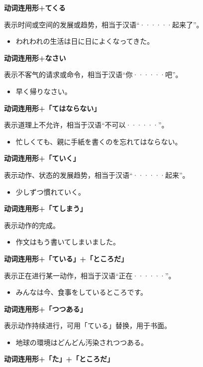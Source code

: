 {\bf
\noindent 动词连用形+てくる
}

表示时间或空间的发展或趋势，相当于汉语``······起来了''。
\begin{itemize}
  \item われわれの生活は日に日によくなってきた。
\end{itemize}

{\bf
\noindent 动词连用形+なさい
}

表示不客气的请求或命令，相当于汉语``你······吧''。
\begin{itemize}
  \item 早く帰りなさい。
\end{itemize}

{\bf
\noindent 动词连用形+「てはならない」
}

表示道理上不允许，相当于汉语``不可以······''。
\begin{itemize}
  \item 忙しくても、親に手紙を書くのを忘れてはならない。
\end{itemize}

{\bf
\noindent 动词连用形+「ていく」
}

表示动作、状态的发展趋势，相当于汉语``······起来''。
\begin{itemize}
  \item 少しずつ慣れていく。
\end{itemize}

{\bf
\noindent 动词连用形+「てしまう」
}

表示动作的完成。
\begin{itemize}
  \item 作文はもう書いてしまいました。
\end{itemize}

{\bf
\noindent 动词连用形+「ている」+「ところだ」
}

表示正在进行某一动作，相当于汉语``正在······''。
\begin{itemize}
  \item みんなは今、食事をしているところです。
\end{itemize}

{\bf
\noindent 动词连用形+「つつある」
}

表示动作持续进行，可用「ている」替换，用于书面。
\begin{itemize}
  \item 地球の環境はどんどん汚染されつつある。
\end{itemize}

{\bf
\noindent 动词连用形+「た」+「ところだ」
}

